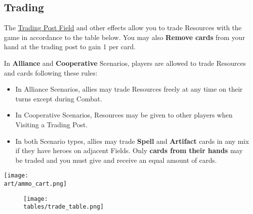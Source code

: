 \begin{multicols}{2}

\subsection*{\hypertarget{Trading}{Trading}}

The \hyperlink{Trading Post}{Trading Post Field} and other effects allow you to trade Resources with the game in accordance to the table below.
You may also \textbf{Remove cards} from your hand at the trading post to gain 1  per card.\par
{}\par
In \textbf{Alliance} and \textbf{Cooperative} Scenarios, players are allowed to trade Resources and cards following these rules:
\begin{itemize}
  \item In Alliance Scenarios, allies may trade Resources freely at any time on their turns except during Combat.
  \item In Cooperative Scenarios, Resources may be given to other players when Visiting a Trading Post.
  \item In both Scenario types, allies may trade \textbf{Spell} and \textbf{Artifact} cards in any mix if they have heroes on adjacent Fields.
    Only \textbf{cards from their hands} may be traded and you must give and receive an equal amount of cards.
\end{itemize}

\vspace*{\fill}
\texttt{[image: \\art/ammo\_cart.png]}

\end{multicols}

\vfill
\begin{figure*}[!hb]
  \centering
  \texttt{[image: \\tables/trade\_table.png]}
\end{figure*}
\vfill

\clearpage

